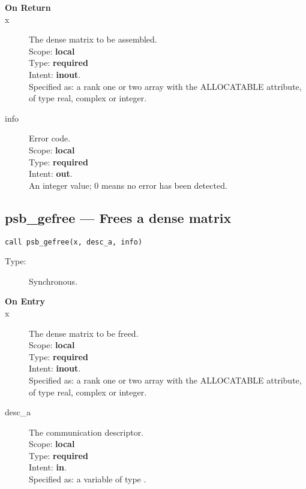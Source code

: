 \begin{description}
\item[\bf On Return]
\item[x] The dense matrix to be assembled.\\
Scope: {\bf local} \\
Type: {\bf required}\\
Intent: {\bf inout}.\\
Specified as: a rank one or two array with the ALLOCATABLE
attribute, of type real, complex or integer.\\
\item[info] Error code.\\
Scope: {\bf local} \\
Type: {\bf required} \\
Intent: {\bf out}.\\
An integer value; 0 means no error has been detected. 
\end{description}
%
%
\clearpage\subsection*{psb\_gefree --- Frees a dense matrix}

\begin{verbatim}
call psb_gefree(x, desc_a, info)
\end{verbatim}

\begin{description}
\item[Type:] Synchronous.
\item[\bf On Entry]
\item[x] The dense matrix to
  be freed.\\
Scope: {\bf local} \\
Type: {\bf required}\\
Intent: {\bf inout}.\\
Specified as: a rank one or two array with the ALLOCATABLE
attribute, of type real, complex or integer.\\

\item[desc\_a] The communication descriptor.\\
Scope: {\bf local} \\
Type: {\bf required}\\
Intent: {\bf in}.\\
Specified as: a variable of type \descdata.\\
\end{description}

